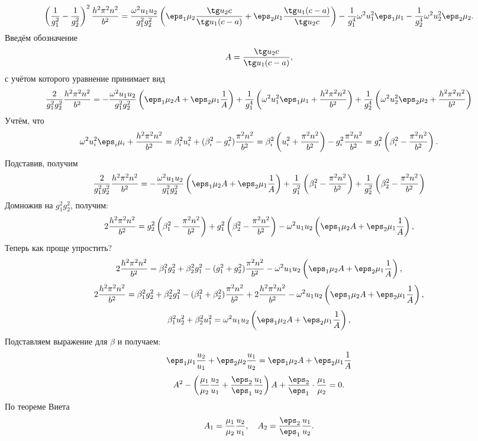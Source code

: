 \documentclass[12pt]{hedsemwork}
\renewcommand{\frac}{\dfrac}
\begin{document}
\[
    \left( \frac{1}{g_1^2} - \frac{1}{g_2^2} \right)^2\frac{h^2\pi^2n^2}{b^2}=
    \frac{\omega^2u_1u_2}{g_1^2g_2^2}\left(\eps_1\mu_2\frac{\tg u_2 c}{\tg u_1
    (c-a)} + \eps_2\mu_1\frac{\tg u_1 (c-a)}{\tg u_2 c}\right) -\frac{1}{g_1^4}
    \omega^2u_1^2\eps_1\mu_1 - \frac{1}{g_2^4}\omega^2u_2^2\eps_2\mu_2.
\]
Введём обозначение
\[
    A = \frac{\tg u_2 c}{\tg u_1 (c-a)},
\]
с учётом которого уравнение принимает вид
\[
    \frac{2}{g_1^2 g_2^2}\frac{h^2\pi^2n^2}{b^2} =
    -\frac{\omega^2u_1u_2}{g_1^2g_2^2}\left(\eps_1\mu_2 A +
    \eps_2\mu_1\frac{1}{A}\right) +
    \frac{1}{g_1^4}
    \left(\omega^2u_1^2\eps_1\mu_1 + \frac{h^2\pi^2n^2}{b^2}\right) +
    \frac{1}{g_2^4}
    \left(\omega^2u_2^2\eps_2\mu_2 + \frac{h^2\pi^2n^2}{b^2}\right)
\]
Учтём, что
\[
    \omega^2u_i^2\eps_i\mu_i + \frac{h^2\pi^2n^2}{b^2} = \beta_i^2u_i^2 +
    (\beta_i^2 - g_i^2)\frac{\pi^2n^2}{b^2} =
    \beta_i^2\left( u_i^2 + \frac{\pi^2n^2}{b^2} \right) -
    g_i^2\frac{\pi^2n^2}{b^2} =
    g_i^2\left( \beta_i^2 - \frac{\pi^2n^2}{b^2}\right).
\]
Подставив, получим
\[
    \frac{2}{g_1^2 g_2^2}\frac{h^2\pi^2n^2}{b^2} =
    -\frac{\omega^2u_1u_2}{g_1^2g_2^2}\left(\eps_1\mu_2 A +
    \eps_2\mu_1\frac{1}{A}\right) +
    \frac{1}{g_1^2}
    \left(\beta_1^2 - \frac{\pi^2n^2}{b^2}\right) +
    \frac{1}{g_2^2}
    \left(\beta_2^2 - \frac{\pi^2n^2}{b^2}\right)
\]
Домножив на \( g_1^2g_2^2 \), получим:
\[
    2\frac{h^2\pi^2n^2}{b^2} = g_2^2
    \left(\beta_1^2 - \frac{\pi^2n^2}{b^2}\right) +
    g_1^2\left(\beta_2^2 - \frac{\pi^2n^2}{b^2}\right)-
    \omega^2u_1u_2\left(\eps_1\mu_2 A +
    \eps_2\mu_1\frac{1}{A}\right),
\]
Теперь как проще упростить?
\[
    2\frac{h^2\pi^2n^2}{b^2} =
    \beta_1^2 g_2^2 + \beta_2^2 g_1^2 -
    (g_1^2+g_2^2)\frac{\pi^2n^2}{b^2} -
    \omega^2u_1u_2\left(\eps_1\mu_2 A +
    \eps_2\mu_1\frac{1}{A}\right),
\]
\[
    2\frac{h^2\pi^2n^2}{b^2} =
    \beta_1^2 g_2^2 + \beta_2^2 g_1^2 -
    (\beta_1^2+\beta_2^2)\frac{\pi^2n^2}{b^2} +
    2\frac{h^2\pi^2n^2}{b^2} -
    \omega^2u_1u_2\left(\eps_1\mu_2 A +
    \eps_2\mu_1\frac{1}{A}\right),
\]
\[
    \beta_1^2u_2^2 + \beta_2^2u_1^2=
    \omega^2u_1u_2\left(\eps_1\mu_2 A +
    \eps_2\mu_1\frac{1}{A}\right),
\]
Подставляем выражение для \( \beta \) и получаем:
\[
    \eps_1\mu_1\frac{u_2}{u_1} + \eps_2\mu_2\frac{u_1}{u_2} =
    \eps_1\mu_2 A + \eps_2\mu_1\frac{1}{A}
\]
\[
    A^2 - \left(
    \frac{\mu_1}{\mu_2}\frac{u_2}{u_1} + \frac{\eps_2}{\eps_1}\frac{u_1}{u_2}
    \right)A + \frac{\eps_2}{\eps_1}\cdot\frac{\mu_1}{\mu_2} = 0.
\]
По теореме Виета
\[
    A_1 = \frac{\mu_1}{\mu_2}\frac{u_2}{u_1},\quad
    A_2 = \frac{\eps_2}{\eps_1}\frac{u_1}{u_2}.
\]
\end{document}
